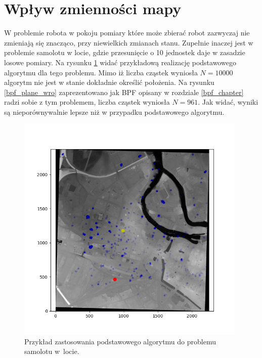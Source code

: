 \section{Wpływ zmienności mapy} \label{zmienna_mapa_chap}
W problemie robota w pokoju pomiary które może zbierać robot zazwyczaj nie zmieniają się znacząco, przy niewielkich zmianach stanu. Zupełnie inaczej jest w problemie samolotu w locie, gdzie przesunięcie o 10 jednostek daje w zasadzie losowe pomiary. Na rysunku \ref{pf_plane} widać przykładową realizację podstawowego algorytmu dla tego problemu. Mimo iż liczba cząstek wyniosła $N=10000$ algorytm nie jest w stanie dokładnie określić położenia. Na rysunku \ref{bpf_plane_wro} zaprezentowano jak BPF opisany w rozdziale \ref{bpf_chapter} radzi sobie z tym problemem, liczba cząstek wyniosła $N=961$. Jak widać, wyniki są nieporównywalnie lepsze niż w przypadku podstawowego algorytmu.
\begin{figure}[H]
	\begin{center}
		\includegraphics[width=11cm]{./pf_plane.png}
		\caption{Przykład zastosowania podstawowego algorytmu do problemu samolotu w~locie.}
		\label{pf_plane}
	\end{center}
\end{figure}
